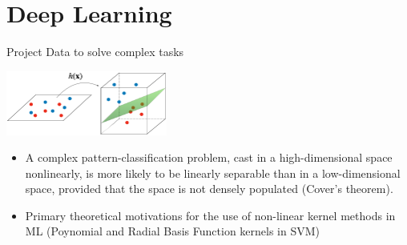 \section{Deep Learning}

\begin{frame}{Project Data to solve complex tasks}
  

    \begin{center}\includegraphics[width=200px]{img/projection.png}\end{center}
    \vspace{0.5cm}
    \begin{itemize}
        \item A complex pattern-classification problem, cast in a high-dimensional space nonlinearly, is more likely to be linearly separable than in a low-dimensional space, provided that the space is not densely populated (Cover's theorem).
        \item Primary theoretical motivations for the use of non-linear kernel methods in ML (Poynomial and Radial Basis Function kernels in SVM)
    \end{itemize}
  
  
  \end{frame}

